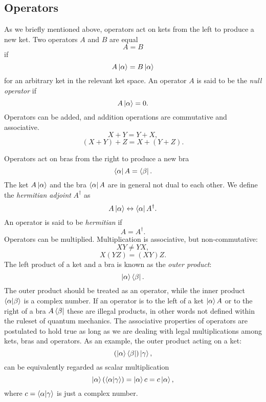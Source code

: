 \subsection{Operators}
As we briefly mentioned above, operators act on kets from the left
to produce a new ket. Two operators $A$ and $B$ are equal
$$ A = B $$
if
$$ A \ket{\alpha} = B \ket{\alpha} $$
for an arbitrary ket in the relevant ket space. An operator $A$
is said to be the \textit{null operator} if
$$ A \ket{\alpha} = 0 .$$
Operators can be added, and addition operations are commutative and associative.
$$ X + Y = Y + X ,$$
$$ (X + Y) + Z = X + (Y + Z) .$$
\par
Operators act on bras from the right to produce a new bra
$$ \bra{\alpha} A = \bra{\beta} .$$
The ket $A \ket{\alpha}$ and the bra $\bra{\alpha} A$ are in general
not dual to each other. We define the \textit{hermitian adjoint} $A^{\dagger}$ as
$$ A \ket{\alpha} \leftrightarrow \bra{\alpha} A^{\dagger} .$$
An operator is said to be \textit{hermitian} if
$$ A = A^{\dagger} .$$
Operators can be multiplied.
Multiplication is associative, but non-commutative:
$$ XY \neq YX ,$$
$$ X(YZ) = (XY)Z .$$
The left product of a ket and a bra is known as the \textit{outer product}:
$$ \ket{\alpha} \bra{\beta} .$$
The outer product should be treated as an operator, while the inner product
$\braket{\alpha | \beta}$ is a complex number.
\newline
If an operator is to the left of a ket $\ket{\alpha} A$ or to the right
of a bra $A \bra{\beta}$ these are illegal products, in other words
not defined within the ruleset of quantum mechanics.
The associative properties of operators are postulated to hold true
as long as we are dealing with legal multiplications among kets, bras
and operators. As an example, the outer product acting on a ket:
$$ (\ket{\alpha} \bra{\beta}) \ket{\gamma} ,$$
can be equivalently regarded as scalar multiplication
$$ \ket{\alpha} (\braket{\alpha | \gamma})
    = \ket{\alpha} c = c \ket{\alpha} ,$$
where $c = \braket{\alpha | \gamma}$ is just a complex number.


